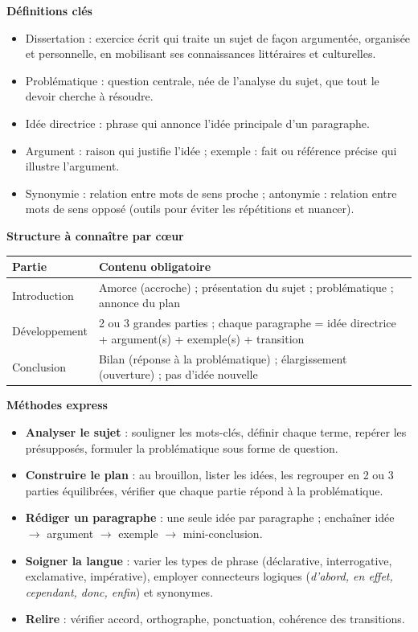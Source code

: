 \documentclass[11pt]{article}
\newcommand{\cle}[1]{{\popxbold\color{popdark}#1}}
\begin{document}
\begin{bilan}
\textbf{Définitions clés}
\begin{itemize}
\item \cle{Dissertation} : exercice écrit qui traite un sujet de façon \cle{argumentée}, organisée et personnelle, en mobilisant ses connaissances littéraires et culturelles.
\item \cle{Problématique} : question centrale, née de l'analyse du sujet, que tout le devoir cherche à résoudre.
\item \cle{Idée directrice} : phrase qui annonce l'idée principale d'un paragraphe.
\item \cle{Argument} : raison qui justifie l'idée ; \cle{exemple} : fait ou référence précise qui illustre l'argument.
\item \cle{Synonymie} : relation entre mots de sens proche ; \cle{antonymie} : relation entre mots de sens opposé (outils pour éviter les répétitions et nuancer).
\end{itemize}

\textbf{Structure à connaître par cœur}
\begin{center}
\begin{tabularx}{\linewidth}{|l|X|}
\hline
\rowcolor{popblueL} \textbf{Partie} & \textbf{Contenu obligatoire} \\
\hline
Introduction & Amorce (accroche) ; présentation du sujet ; problématique ; annonce du plan \\
\hline
Développement & 2 ou 3 grandes parties ; chaque paragraphe = idée directrice + argument(s) + exemple(s) + transition \\
\hline
Conclusion & Bilan (réponse à la problématique) ; élargissement (ouverture) ; pas d'idée nouvelle \\
\hline
\end{tabularx}
\end{center}

\textbf{Méthodes express}
\begin{itemize}
\item \textbf{Analyser le sujet} : souligner les mots-clés, définir chaque terme, repérer les présupposés, formuler la problématique sous forme de question.
\item \textbf{Construire le plan} : au brouillon, lister les idées, les regrouper en 2 ou 3 parties équilibrées, vérifier que chaque partie répond à la problématique.
\item \textbf{Rédiger un paragraphe} : une seule idée par paragraphe ; enchaîner idée $\rightarrow$ argument $\rightarrow$ exemple $\rightarrow$ mini-conclusion.
\item \textbf{Soigner la langue} : varier les types de phrase (déclarative, interrogative, exclamative, impérative), employer connecteurs logiques (\emph{d'abord, en effet, cependant, donc, enfin}) et synonymes.
\item \textbf{Relire} : vérifier accord, orthographe, ponctuation, cohérence des transitions.
\end{itemize}
\end{bilan}
\end{document}
